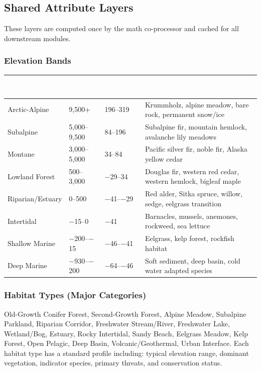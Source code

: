 \documentclass[11pt,letterpaper]{article}
\newcommand{\tableheader}[1]{\textbf{\sffamily\textcolor{white}{#1}}}
\begin{document}
\subsection{Shared Attribute Layers}

These layers are computed once by the math co-processor and cached for all downstream modules.

\subsubsection{Elevation Bands}

\begin{center}
\begin{tabularx}{\textwidth}{L{3cm}C{2cm}C{2cm}X}
\toprule
{}
\tableheader{Zone} & \tableheader{Range (ft)} & \tableheader{MC Y-Range} & \tableheader{Dominant Community} \\
\midrule
Arctic-Alpine & 9,500+ & 196--319 & Krummholz, alpine meadow, bare rock, permanent snow/ice \\
Subalpine & 5,000--9,500 & 84--196 & Subalpine fir, mountain hemlock, avalanche lily meadows \\
Montane & 3,000--5,000 & 34--84 & Pacific silver fir, noble fir, Alaska yellow cedar \\
Lowland Forest & 500--3,000 & $-$29--34 & Douglas fir, western red cedar, western hemlock, bigleaf maple \\
Riparian/Estuary & 0--500 & $-$41--$-$29 & Red alder, Sitka spruce, willow, sedge, eelgrass transition \\
Intertidal & $-$15--0 & $-$41 & Barnacles, mussels, anemones, rockweed, sea lettuce \\
Shallow Marine & $-$200--$-$15 & $-$46--$-$41 & Eelgrass, kelp forest, rockfish habitat \\
Deep Marine & $-$930--$-$200 & $-$64--$-$46 & Soft sediment, deep basin, cold water adapted species \\
\bottomrule
\end{tabularx}
\end{center}

\subsubsection{Habitat Types (Major Categories)}

Old-Growth Conifer Forest, Second-Growth Forest, Alpine Meadow, Subalpine Parkland, Riparian Corridor, Freshwater Stream/River, Freshwater Lake, Wetland/Bog, Estuary, Rocky Intertidal, Sandy Beach, Eelgrass Meadow, Kelp Forest, Open Pelagic, Deep Basin, Volcanic/Geothermal, Urban Interface. Each habitat type has a standard profile including: typical elevation range, dominant vegetation, indicator species, primary threats, and conservation status.
\end{document}
